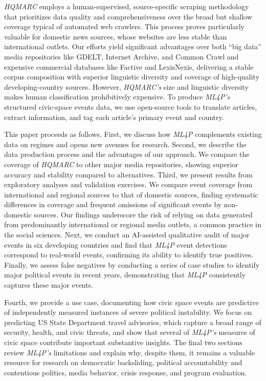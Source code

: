 \documentclass[
  letterpaper,
  DIV=11,
  numbers=noendperiod]{scrartcl}
\begin{document}
\emph{HQMARC} employs a human-supervised, source-specific scraping
methodology that prioritizes data quality and comprehensiveness over the
broad but shallow coverage typical of automated web crawlers. This
process proves particularly valuable for domestic news sources, whose
websites are less stable than international outlets. Our efforts yield
significant advantages over both ``big data'' media repositories like
GDELT, Internet Archive, and Common Crawl and expensive commercial
databases like Factive and LexisNexis, delivering a stable corpus
composition with superior linguistic diversity and coverage of
high-quality developing-country sources. However, \emph{HQMARC's} size
and linguistic diversity makes human classification prohibitively
expensive. To produce \emph{ML4P's} structured civic-space events data,
we use open-source tools to translate articles, extract information, and
tag each article's primary event and country.

This paper proceeds as follows. First, we discuss how \emph{ML4P}
complements existing data on regimes and opens new avenues for research.
Second, we describe the data production process and the advantages of
our approach. We compare the coverage of \emph{HQMARC} to other major
media repositories, showing superior accuracy and stability compared to
alternatives. Third, we present results from exploratory analyses and
validation exercises. We compare event coverage from international and
regional sources to that of domestic sources, finding systematic
differences in coverage and frequent omissions of significant events by
non-domestic sources. Our findings underscore the risk of relying on
data generated from predominantly international or regional media
outlets, a common practice in the social sciences. Next, we conduct an
AI-assisted qualitative audit of major events in six developing
countries and find that \emph{ML4P} event detections correspond to
real-world events, confirming its ability to identify true positives.
Finally, we assess false negatives by conducting a series of case
studies to identify major political events in recent years,
demonstrating that \emph{ML4P} consistently captures these major events.

Fourth, we provide a use case, documenting how civic space events are
predictive of independently measured instances of severe political
instability. We focus on predicting US State Department travel
advisories, which capture a broad range of security, health, and civic
threats, and show that several of \emph{ML4P's} measures of civic space
contribute important substantive insights. The final two sections review
\emph{ML4P's} limitations and explain why, despite them, it remains a
valuable resource for research on democratic backsliding, political
accountability and contentious politics, media behavior, crisis
response, and program evaluation.
\end{document}
